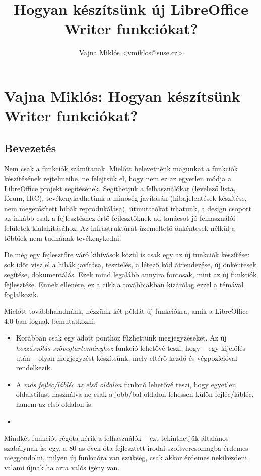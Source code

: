 \documentclass[a4paper]{report}
\title{Hogyan készítsünk új LibreOffice Writer funkciókat?}
\author{Vajna Miklós <vmiklos@suse.cz>}
\begin{document}
\tableofcontents

\chapter{Vajna Miklós: Hogyan készítsünk Writer funkciókat?}

\section{Bevezetés}

Nem csak a funkciók számítanak. Mielőtt belevetnénk magunkat a funkciók
készítésének rejtelmeibe, ne felejtsük el, hogy nem ez az egyetlen módja a
LibreOffice projekt segítésének. Segíthetjük a felhasználókat (levelező lista,
fórum, IRC), tevékenykedhetünk a minőség javításán (hibajelentések készítése,
nem megerősített hibák reprodukálása), útmutatókat írhatunk, a design csoport
az inkább csak a fejlesztéshez értő fejlesztőknek ad tanácsot jó felhasználói
felületek kialakításához. Az infrastruktúrát üzemeltető önkéntesek nélkül a
többiek nem tudnának tevékenykedni.

De még egy fejlesztőre váró kihívások közül is csak egy az új funkciók
készítése: sok időt visz el a hibák javítása, tesztelés, a létező kód
átrendezése, új önkéntesek segítése, dokumentálás. Ezek mind legalább annyira
fontosak, mint az új funkciók fejlesztése. Ennek ellenére, ez a cikk a
továbbiakban kizárólag ezzel a témával foglalkozik.

Mielőtt továbbhaladnánk, nézzünk két példát új funkciókra, amik a LibreOffice
4.0-ban fognak bemutatkozni:

\begin{itemize}
\item Korábban csak egy adott ponthoz fűzhettünk megjegyzéseket. Az új
\emph{hozzászólás szövegtartományhoz} funkció lehetővé teszi, hogy -- egy
kijelölés után -- olyan megjegyzést készítsünk, mely eltérő kezdő
és végpozícióval rendelkezik.
\item A \emph{más fejléc/lábléc az első oldalon} funkció lehetővé teszi, hogy
egyetlen oldalstílust használva ne csak a jobb/bal oldalon lehessen külön
fejléc/lábléc, hanem az első oldalon is.
\item
\end{itemize}

Mindkét funkciót régóta kérik a felhasználók -- ezt tekinthetjük általános
szabálynak is: egy, a 80-as évek óta fejlesztett irodai szoftvercsomagba
érdemes meggondolni, milyen új funkcióra van szükség, csak akkor érdemes
nekikezdeni valami újnak ha arra valós igény van.
\end{document}
